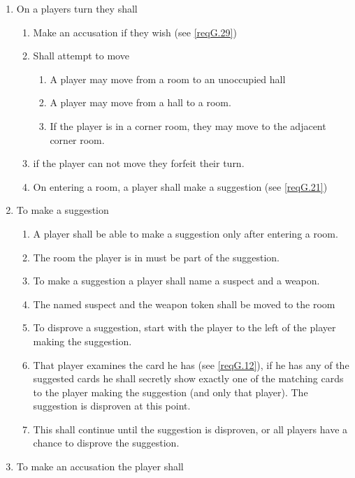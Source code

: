 \documentclass[10pt]{article}
\begin{document}
\begin{enumerate}[label=G.\arabic*]
\item \label{reqG.15} On a players turn they shall
\begin{enumerate}[label=\ref{reqG.15}.\arabic*]
    \item \label{reqG.16} Make an accusation if they wish (see \ref{reqG.29})
    \item \label{reqG.17} Shall attempt to move 
        \begin{enumerate}
        \item A player may move from a room to an unoccupied hall
        \item A player may move from a hall to a room. 
        \item If the player is in a corner room, they may move to the adjacent corner room.
        \end{enumerate}
    \item \label{reqG.19} if the player can not move they forfeit their turn.
    \item \label {reqG.20} On entering a room, a player shall make a suggestion (see \ref{reqG.21})
\end{enumerate}
\item \label{reqG.21} To make a suggestion
    \begin{enumerate}
    \item \label{reqG.22} A player shall be able to make a suggestion only after entering a room.
    \item \label{reqG.23} The room the player is in must be part of the suggestion.
    \item \label{reqG.23} To make a suggestion a player shall name a suspect and a weapon.
    \item \label{reqG.25} The named suspect and the weapon token shall be moved to the room
    \item \label{reqG.26} To disprove a suggestion, start with the player to the left of the player making the suggestion.
    \item \label{reqG.27} That player examines the card he has (see \ref{reqG.12}), if he has any of the suggested cards he shall secretly show exactly one of the matching cards to the player making the suggestion (and only that player).  The suggestion is disproven at this point.
    \item \label{reqG.28} This shall continue until the suggestion is disproven, or all players have a chance to disprove the suggestion.
    \end{enumerate}
\item \label{reqG.29} To make an accusation the player shall

\end{enumerate}
\end{document}
